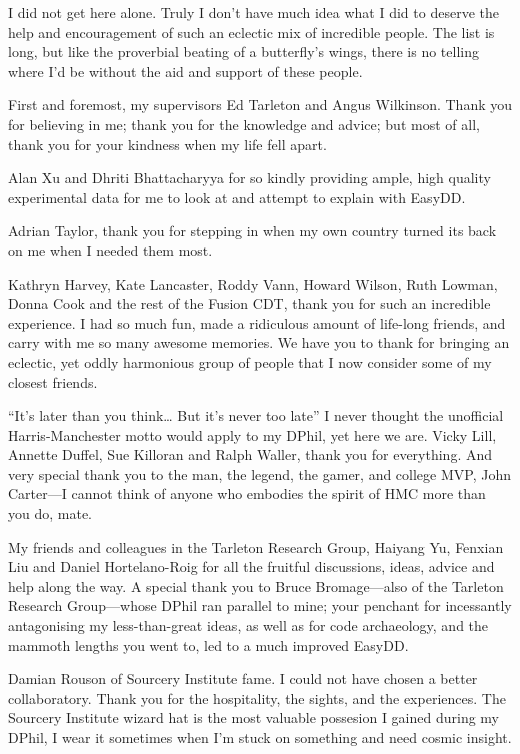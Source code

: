 \begin{frontmatter}[Acknowledgements]

    \begin{justify}
        I did not get here alone. Truly I don't have much idea what I did to deserve the help and encouragement of such an eclectic mix of incredible people. The list is long, but like the proverbial beating of a butterfly's wings, there is no telling where I'd be without the aid and support of these people.

        First and foremost, my supervisors Ed Tarleton and Angus Wilkinson. Thank you for believing in me; thank you for the knowledge and advice; but most of all, thank you for your kindness when my life fell apart.

        Alan Xu and Dhriti Bhattacharyya for so kindly providing ample, high quality experimental data for me to look at and attempt to explain with EasyDD.

        Adrian Taylor, thank you for stepping in when my own country turned its back on me when I needed them most.

        Kathryn Harvey, Kate Lancaster, Roddy Vann, Howard Wilson, Ruth Lowman, Donna Cook and the rest of the Fusion CDT, thank you for such an incredible experience. I had so much fun, made a ridiculous amount of life-long friends, and carry with me so many awesome memories. We have you to thank for bringing an eclectic, yet oddly harmonious group of people that I now consider some of my closest friends.

        ``It's later than you think\ldots{} But it's never too late'' I never thought the unofficial Harris-Manchester motto would apply to my DPhil, yet here we are. Vicky Lill, Annette Duffel, Sue Killoran and Ralph Waller, thank you for everything. And very special thank you to the man, the legend, the gamer, and college MVP, John Carter---I cannot think of anyone who embodies the spirit of HMC more than you do, mate.

        My friends and colleagues in the Tarleton Research Group, Haiyang Yu, Fenxian Liu and Daniel Hortelano-Roig for all the fruitful discussions, ideas, advice and help along the way. A special thank you to Bruce Bromage---also of the Tarleton Research Group---whose DPhil ran parallel to mine; your penchant for incessantly antagonising my less-than-great ideas, as well as for code archaeology, and the mammoth lengths you went to, led to a much improved EasyDD.

        Damian Rouson of Sourcery Institute fame. I could not have chosen a better collaboratory. Thank you for the hospitality, the sights, and the experiences. The Sourcery Institute wizard hat is the most valuable possesion I gained during my DPhil, I wear it sometimes when I'm stuck on something and need cosmic insight.


\end{justify}
\end{frontmatter}
